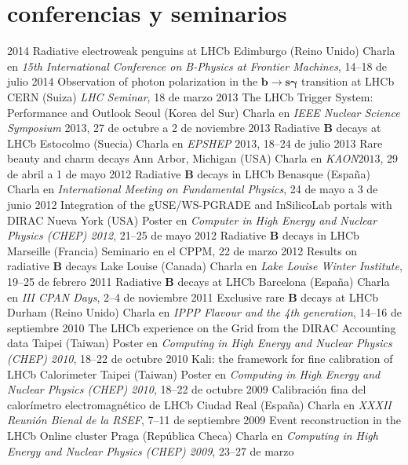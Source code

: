 {
\section{conferencias y seminarios}

    \cventry
        {2014}
        {Radiative electroweak penguins at LHCb}
        {Edimburgo (Reino Unido)}
        {Charla en \emph{15th International Conference on B-Physics at Frontier Machines}, 14--18 de julio}
    \cventry
        {2014}
        {Observation of photon polarization in the $\mathbf{b\to s\gamma}$ transition at LHCb}
        {CERN (Suiza)}
        {\emph{LHC Seminar}, 18 de marzo}
    \cventry
        {2013}
        {The LHCb Trigger System: Performance and Outlook}
        {Seoul (Korea del Sur)}
        {Charla en \emph{IEEE Nuclear Science Symposium} 2013, 27 de octubre a 2 de noviembre}
    \cventry
        {2013}
        {Radiative $\mathbf{B}$ decays at LHCb}
        {Estocolmo (Suecia)}
        {Charla en \emph{EPSHEP} $2013$, 18--24 de julio}
    \cventry
        {2013}
        {Rare beauty and charm decays}
        {Ann Arbor, Michigan (USA)}
        {Charla en \emph{KAON}$2013$, 29 de abril a 1 de mayo}
    \cventry
        {2012}
        {Radiative $\mathbf{B}$ decays in LHCb}
        {Benasque (España)}
        {Charla en \emph{International Meeting on Fundamental Physics}, 24 de mayo a 3 de junio}
    \cventry
        {2012}
        {Integration of the gUSE/WS-PGRADE and InSilicoLab portals with DIRAC}
        {Nueva York (USA)}
        {Poster en \emph{Computer in High Energy and Nuclear Physics (CHEP) 2012}, 21--25 de mayo}
    \cventry
        {2012}
        {Radiative $\mathbf{B}$ decays in LHCb}
        {Marseille (Francia)}
        {Seminario en el CPPM, 22 de marzo}
    \cventry
        {2012}
        {Results on radiative $\mathbf{B}$ decays}
        {Lake Louise (Canada)}
        {Charla en \emph{Lake Louise Winter Institute}, 19--25 de febrero}
    \cventry
        {2011}
        {Radiative $\mathbf{B}$ decays at LHCb}
        {Barcelona (España)}
        {Charla en \emph{III CPAN Days}, 2--4 de noviembre}
    \cventry
        {2011}
        {Exclusive rare $\mathbf{B}$ decays at LHCb}
        {Durham (Reino Unido)}
        {Charla en \emph{IPPP Flavour and the 4th generation}, 14--16 de septiembre}
    \cventry
        {2010}
        {The LHCb experience on the Grid from the DIRAC Accounting data}
        {Taipei (Taiwan)}
        {Poster en \emph{Computing in High Energy and Nuclear Physics (CHEP) 2010}, 18--22 de octubre}
    \cventry
        {2010}
        {Kali: the framework for fine calibration of LHCb Calorimeter}
        {Taipei (Taiwan)}
        {Poster en \emph{Computing in High Energy and Nuclear Physics (CHEP) 2010}, 18--22 de octubre}
    \cventry
        {2009}
        {Calibraci\'{o}n fina del calor\'{i}metro electromagn\'{e}tico de LHCb}
        {Ciudad Real (España)}
        {Charla en \emph{XXXII Reuni\'{o}n Bienal de la RSEF}, 7--11 de septiembre}
    \cventry
        {2009}
        {Event reconstruction in the LHCb Online cluster}
        {Praga (República Checa)}
        {Charla en \emph{Computing in High Energy and Nuclear Physics (CHEP) 2009}, 23--27 de marzo}
}{}

